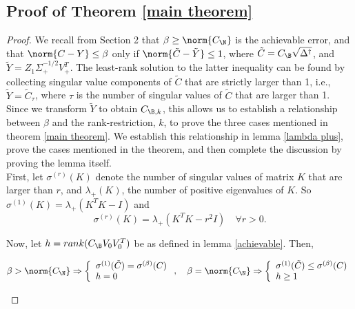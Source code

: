 \subsection{Proof of Theorem \ref{main theorem}}
\begin{proof}
We recall from Section 2 that $\beta \geq \norm{C_{\N}}$ is the achievable error, and that $\norm{{C} - {Y}} \leq \beta$ only if $\norm{\tilde{C} - \tilde{Y}} \leq 1$, where $\tilde{C} = C_{\B} \sqrt{\Delta^{\dagger}}$, and $\tilde{Y} = Z_1{\Sigma}^{-1/2}_+V_+^T$. The least-rank solution to the latter inequality can be found by collecting singular value components of $\tilde{C}$ that are strictly larger than 1, i.e., $\tilde{Y} = \tilde{C}_{\tau}$, where $\tau$ is the number of singular values of $\tilde{C}$ that are larger than 1. Since we transform $\tilde Y$ to obtain $C_{\B, k}$, this allows us to establish a relationship between $\beta$ and the rank-restriction, $k$, to prove the three cases mentioned in theorem \ref{main theorem}. We establish this relationship in lemma \ref{lambda plus}, prove the cases mentioned in the theorem, and then complete the discussion by proving the lemma itself.\\  
\noindent First, let $ \sigma^{(r)}(K)$ denote the  number of singular values of matrix $K$ that are larger than $r$, and $\lambda_{+}(K)$, the number of positive eigenvalues of $K$.
So $\sigma^{(1)}(K) = \lambda_{+}(K^T K - I)$ and
\[ \sigma^{(r)}(K) =  \lambda_{+}( K^T K - r^2 I) \quad \forall r > 0. \]

Now, let $h  = rank(C_{\B} V_0 V_0 ^T)$ be as defined in lemma \ref{achievable}. Then, 
\begin{lemma}\label{lambda plus}
\[ \beta > \norm{C_{\N}} \Rightarrow \left\{ \begin{array}{l} \sigma^{(1)}(\tilde{C}) = \sigma^{(\beta)} (C) \\ h = 0 \end{array} \right. , \quad \beta = \norm{C_{\N}} \Rightarrow \left\{ \begin{array}{l} \sigma^{(1)}(\tilde{C}) \leq \sigma^{(\beta)} (C) \\ h \geq 1 \end{array} \right. \]
\end{lemma}


\end{proof}
